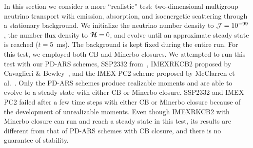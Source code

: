 In this section we consider a more ``realistic'' test: two-dimensional multigroup neutrino transport with emission, absorption, and isoenergetic scattering through a stationary background.  
We initialize the neutrino number density to $\mathcal{J} = 10^{-99}$, the number flux density to $\boldsymbol{\mathcal{H}}=0$, and evolve until an approximate steady state is reached ($t=5$~ms).
The background is kept fixed during the entire run.  
For this test, we employed both CB and Minerbo closures.  
We attempted to run this test with our PD-ARS schemes, SSP2332 from~\cite{pareschiRusso_2005}, IMEXRKCB2 proposed by Cavaglieri \& Bewley~\cite{cavaglieriBewley2015}, and the IMEX PC2 scheme proposed by McClarren et al.~\cite{mcclarren_etal_2008}.
Only the PD-ARS schemes produce realizable moments and are able to evolve to a steady state with either CB or Minerbo closure.
SSP2332 and IMEX PC2 failed after a few time steps with either CB or Minerbo closure because of the development of unrealizable moments.
Even though IMEXRKCB2 with Minerbo closure can run and reach a steady state in this test, its results are different from that of PD-ARS schemes with CB closure, and there is no guarantee of stability.  

